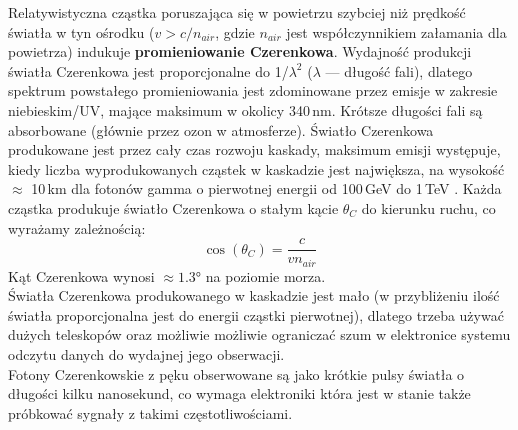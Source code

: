 \documentclass[a4paper,11pt,twoside]{article}
\begin{document}
Relatywistyczna cząstka poruszająca się w powietrzu szybciej niż prędkość światła w tyn ośrodku ($v > c/n_{air}$, gdzie $n_{air}$ jest współczynnikiem załamania dla powietrza) indukuje {\bf{promieniowanie Czerenkowa}}.
Wydajność produkcji światła Czerenkowa jest proporcjonalne do 1/$\lambda^2$ ($\lambda$ --- długość fali), dlatego spektrum powstałego promieniowania jest zdominowane przez emisje w zakresie niebieskim/UV, mające maksimum w okolicy 340\,nm. Krótsze długości fali są absorbowane (głównie przez ozon w atmosferze). Światło Czerenkowa produkowane jest przez cały czas rozwoju kaskady, maksimum emisji występuje, kiedy liczba wyprodukowanych cząstek w kaskadzie jest największa, na wysokość $\approx$ 10\,km dla fotonów gamma o pierwotnej energii od 100\,GeV do 1\,TeV \cite{IACT}. Każda cząstka produkuje światło Czerenkowa o stałym kącie $\theta_C$ do kierunku ruchu, co wyrażamy zależnością:
\begin{equation}
\cos (\theta_C) = \frac{c}{v n_{air}}
\end{equation}
Kąt Czerenkowa wynosi $\approx \ang{1.3}$ na poziomie morza. \\
Światła Czerenkowa produkowanego w kaskadzie jest mało (w przybliżeniu ilość światła proporcjonalna jest do energii cząstki pierwotnej), dlatego trzeba używać dużych teleskopów oraz możliwie możliwie ograniczać szum w elektronice systemu odczytu danych do wydajnej jego obserwacji. \\
Fotony Czerenkowskie z pęku obserwowane są jako krótkie pulsy światła o długości kilku nanosekund, co wymaga elektroniki która jest w stanie także próbkować sygnały z takimi częstotliwościami. 
\end{document}
